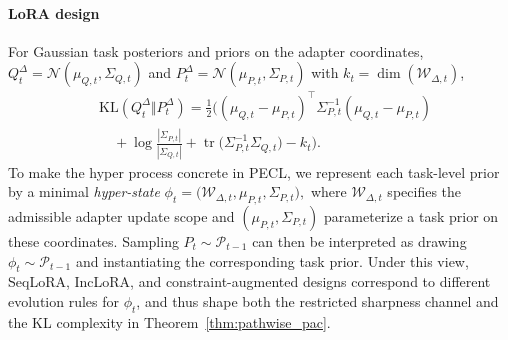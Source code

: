 \documentclass{article}
\theoremstyle{plain}
\theoremstyle{definition}
\theoremstyle{remark}
\begin{document}
\paragraph{LoRA design}
For Gaussian task posteriors and priors on the adapter coordinates,
$Q_t^\Delta=\mathcal N(\mu_{Q,t},\Sigma_{Q,t})$ and $P_t^\Delta=\mathcal N(\mu_{P,t},\Sigma_{P,t})$ with $k_t=\dim(\mathcal W_{\Delta,t})$,
\begin{equation*}
    \begin{aligned}
&\mathrm{KL}(Q_t^\Delta\Vert P_t^\Delta)
=
\frac12\Bigg(
(\mu_{Q,t}-\mu_{P,t})^\top\Sigma_{P,t}^{-1}(\mu_{Q,t}-\mu_{P,t}) \\
&\quad  +\log\frac{|\Sigma_{P,t}|}{|\Sigma_{Q,t}|}
+\operatorname{tr}\big(\Sigma_{P,t}^{-1}\Sigma_{Q,t}\big)
-k_t
\Bigg).
    \end{aligned}
\end{equation*}
To make the hyper process concrete in PECL, we represent each task-level prior by a minimal \emph{hyper-state}
$
\phi_t = \bigl(\mathcal W_{\Delta,t},\mu_{P,t},\Sigma_{P,t}\bigr),
$
where $\mathcal W_{\Delta,t}$ specifies the admissible adapter update scope and $(\mu_{P,t},\Sigma_{P,t})$ parameterize a task prior on these coordinates.
Sampling $P_t\sim\mathcal P_{t-1}$ can then be interpreted as drawing $\phi_t\sim\mathcal P_{t-1}$ and instantiating the corresponding task prior. Under this view, SeqLoRA, IncLoRA, and constraint-augmented designs correspond to different evolution rules for $\phi_t$, and thus shape both the restricted sharpness channel and the KL complexity in Theorem~\ref{thm:pathwise_pac}.






\end{document}
